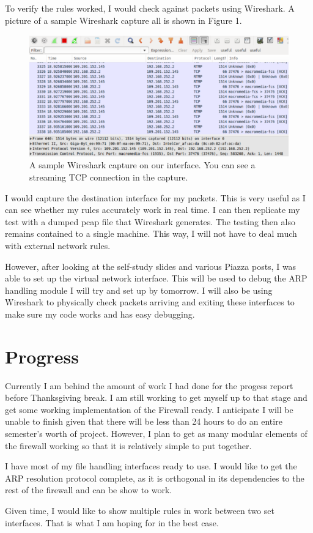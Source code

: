 \documentclass[12pt]{article}
\begin{document}
To verify the rules worked, I would check against packets using Wireshark.
A picture of a sample Wireshark capture all is shown in Figure 1. \\
\begin{figure}[h]
	\includegraphics[scale=0.77]{wireshark.png}
	\caption{A sample Wireshark capture on our interface.
			 You can see a streaming TCP connection in the capture.}
\end{figure}
I would capture the destination interface for my packets.
This is very useful as I can see whether my rules accurately work in real time.
I can then replicate my test with a dumped pcap file that Wireshark generates.
The testing then also remains contained to a single machine.
This way, I will not have to deal much with external network rules. \par

However, after looking at the self-study slides and various Piazza posts,
I was able to set up the virtual network interface. This will be used to
debug the ARP handling module I will try and set up by tomorrow. I will also be
using Wireshark to physically check packets arriving and exiting these interfaces 
to make sure my code works and has easy debugging. \par

\section{Progress}

Currently I am behind the amount of work I had done for the progess report 
before Thanksgiving break. I am still working to get myself up to that stage
and get some working implementation of the Firewall ready. I anticipate I will
be unable to finish given that there will be less than 24 hours to do an entire
semester's worth of project. However, I plan to get as many modular elements of
the firewall working so that it is relatively simple to put together. \par
I have most of my file handling interfaces ready to use. I would like to get
the ARP resolution protocol complete, as it is orthogonal in its dependencies
to the rest of the firewall and can be show to work. \par
Given time, I would like to show multiple rules in work between two set
interfaces. That is what I am hoping for in the best case. 
\end{document}
